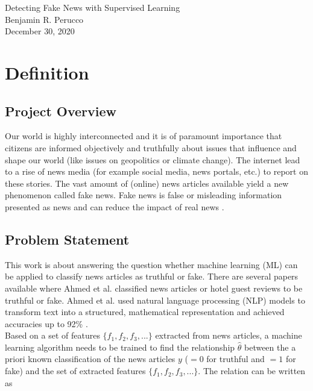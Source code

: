 \documentclass[a4paper,12pt,nottoc]{article}
\begin{document}
\begin{center}{\LARGE Detecting Fake News with Supervised Learning}\\\vspace{.5cm}Benjamin R. Perucco\\\vspace{.25cm}December 30, 2020\end{center}

\section{Definition}

\subsection{Project Overview}

Our world is highly interconnected and it is of paramount importance that citizens are informed objectively and truthfully about issues that influence and shape our world (like issues on geopolitics or climate change). The internet lead to a rise of news media (for example social media, news portals, etc.) to report on these stories. The vast amount of (online) news articles available yield a new phenomenon called fake news. Fake news is false or misleading information presented as news and can reduce the impact of real news \cite{bib:fakenews}. 

\subsection{Problem Statement}

This work is about answering the question whether machine learning (ML) can be applied to classify news articles as truthful or fake. There are several papers available where Ahmed et al. classified news articles \cite{bib:ahmed-2017} or hotel guest reviews \cite{bib:ahmed-2018} to be truthful or fake. Ahmed et al. used natural language processing (NLP) models to transform text into a structured, mathematical representation and achieved accuracies up to 92\% \cite{bib:ahmed-2017}.\\

\noindent Based on a set of features $\{f_{1}, f_{2}, f_{3}, ... \}$ extracted from news articles, a machine learning algorithm needs to be trained to find the relationship $\hat{\theta}$ between the a priori known classification of the news articles $y$ ($=0$ for truthful and $=1$ for fake) and the set of extracted features $\{f_{1}, f_{2}, f_{3}, ... \}$. The relation can be written as
\end{document}
